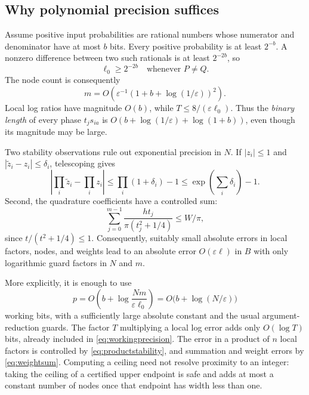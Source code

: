 \documentclass[11pt]{article}
\theoremstyle{definition}
\theoremstyle{remark}
\newcommand{\eps}{\varepsilon}
\begin{document}
\subsection{Why polynomial precision suffices}

Assume positive input probabilities are rational numbers whose numerator and denominator have at most $b$ bits. Every positive probability is at least $2^{-b}$. A nonzero difference between two such rationals is at least $2^{-2b}$, so
\begin{equation}
 \ell_0\ge2^{-2b}\quad\text{whenever }P\ne Q.
 \label{eq:bitgap}
\end{equation}
The node count is consequently
\begin{equation}
 m=O\!\left(\eps^{-1}(1+b+\log(1/\eps))^2\right).
 \label{eq:bitnodes}
\end{equation}
Local log ratios have magnitude $O(b)$, while $T\le8/(\eps\ell_0)$. Thus the \emph{binary length} of every phase $t_js_{ia}$ is $O(b+\log(1/\eps)+\log(1+b))$, even though its magnitude may be large.

Two stability observations rule out exponential precision in $N$. If $|z_i|\le1$ and $|\widetilde z_i-z_i|\le\delta_i$, telescoping gives
\begin{equation}
 \left|\prod_i\widetilde z_i-\prod_i z_i\right|
 \le\prod_i(1+\delta_i)-1
 \le\exp\left(\sum_i\delta_i\right)-1.
 \label{eq:productstability}
\end{equation}
Second, the quadrature coefficients have a controlled sum:
\begin{equation}
 \sum_{j=0}^{m-1}\frac{h t_j}{\pi(t_j^2+1/4)}
 \le W/\pi,
 \label{eq:weightsum}
\end{equation}
since $t/(t^2+1/4)\le1$. Consequently, suitably small absolute errors in local factors, nodes, and weights lead to an absolute error $O(\eps\ell)$ in $B$ with only logarithmic guard factors in $N$ and $m$.

More explicitly, it is enough to use
\begin{equation}
 p=O\!\left(b+\log\frac{Nm}{\eps\ell_0}\right)
   =O\bigl(b+\log(N/\eps)\bigr)
 \label{eq:workingprecision}
\end{equation}
working bits, with a sufficiently large absolute constant and the usual argument-reduction guards. The factor $T$ multiplying a local log error adds only $O(\log T)$ bits, already included in \eqref{eq:workingprecision}. The error in a product of $n$ local factors is controlled by \eqref{eq:productstability}, and summation and weight errors by \eqref{eq:weightsum}. Computing a ceiling need not resolve proximity to an integer: taking the ceiling of a certified upper endpoint is safe and adds at most a constant number of nodes once that endpoint has width less than one.
\end{document}
